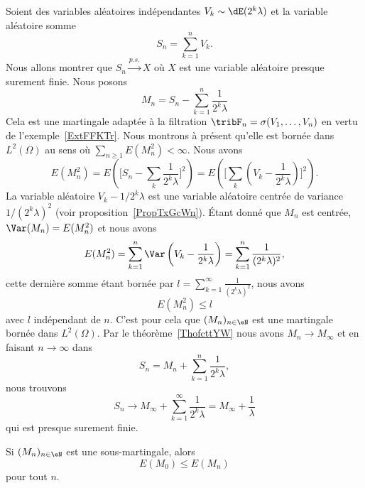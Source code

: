 \begin{example}
	Soient des variables aléatoires indépendantes \( V_k\sim\dE(2^k\lambda)\) et la variable aléatoire somme
	\begin{equation}
		S_n=\sum_{k=1}^nV_k.
	\end{equation}
	Nous allons montrer que \( S_n\stackrel{p.s.}{\longrightarrow}X\) où \( X\) est une variable aléatoire presque surement finie. Nous posons
	\begin{equation}
		M_n=S_n-\sum_{k=1}^n\frac{1}{ 2^k\lambda }
	\end{equation}
	Cela est une martingale adaptée à la filtration \( \tribF_n=\sigma(V_1,\ldots, V_n)\) en vertu de l'exemple~\ref{ExtFFKTr}. Nous montrons à présent qu'elle est bornée dans \( L^2(\Omega)\) au sens où \( \sum_{n\geq 1}E(M_n^2)<\infty\). Nous avons
	\begin{equation}
		E(M_n^2)=E\left( \big[ S_n-\sum_k\frac{1}{ 2^k\lambda } \big]^2 \right)=E\left( \big[ \sum_k(V_k-\frac{1}{ 2^k\lambda }) \big]^2 \right).
	\end{equation}
	La variable aléatoire \( V_k-1/2^k\lambda\) est une variable aléatoire centrée de variance \( 1/(2^k\lambda)^2\) (voir proposition~\ref{PropTxGcWn}). Étant donné que \( M_n\) est centrée, \( \Var(M_n)=E(M_n^2)\) et nous avons
	\begin{equation}
		E(M_n^2)=\sum_{k=1}^n\Var\left( V_k-\frac{1}{ 2^k\lambda } \right)=\sum_{k=1}^n\frac{1}{ (2^k\lambda)^2 },
	\end{equation}
	cette dernière somme étant bornée par \( l=\sum_{k=1}^{\infty}\frac{1}{ (2^k\lambda)^2 }\), nous avons
	\begin{equation}
		E(M_n^2)\leq l
	\end{equation}
	avec \( l\) indépendant de \( n\). C'est pour cela que \( (M_n)_{n\in \eN}\) est une martingale bornée dans \( L^2(\Omega)\). Par le théorème~\ref{ThofcttYW} nous avons \( M_n\to M_{\infty}\) et en faisant \( n\to \infty\) dans
	\begin{equation}
		S_n=M_n+\sum_{k=1}^n\frac{1}{ 2^k\lambda },
	\end{equation}
	nous trouvons
	\begin{equation}
		S_n\to M_{\infty}+\sum_{k=1}^{\infty}\frac{1}{ 2^k\lambda }=M_{\infty}+\frac{1}{ \lambda }
	\end{equation}
	qui est presque surement finie.
\end{example}

\begin{proposition}	\label{PROPooSWTPooOvzYPQ}
	Si \( (M_n)_{n\in \eN}\) est une sous-martingale, alors
	\begin{equation}
		E(M_0)\leq E(M_n)
	\end{equation}
	pour tout \( n\).
\end{proposition}




